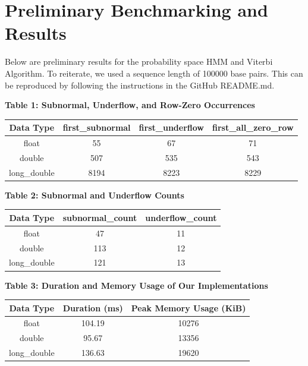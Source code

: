 \documentclass{article}
\begin{document}
\section{Preliminary Benchmarking and Results}
Below are preliminary results for the probability space HMM and Viterbi Algorithm. To reiterate, we used a sequence length of 100000 base pairs. This can be reproduced by following the instructions in the GitHub README.md.
\begin{center}
\textbf{Table 1: Subnormal, Underflow, and Row-Zero Occurrences}
\end{center}
\begin{center}
\begin{tabular}{||c c c c||} 
 \hline
 Data Type & first\_subnormal & first\_underflow & first\_all\_zero\_row \\ [0.5ex] 
 \hline\hline
 float & 55 & 67 & 71 \\ 
 \hline
 double & 507 & 535 & 543 \\
 \hline
 long\_double & 8194 & 8223 & 8229 \\
 \hline
\end{tabular}
\end{center}
\begin{center}
\textbf{Table 2: Subnormal and Underflow Counts}
\end{center}
\begin{center}
\begin{tabular}{||c c c||} 
 \hline
 Data Type & subnormal\_count & underflow\_count \\ [0.5ex] 
 \hline\hline
 float & 47 & 11 \\ 
 \hline
 double & 113 & 12 \\
 \hline
 long\_double & 121 & 13 \\
 \hline
\end{tabular}
\end{center}
\begin{center}
\textbf{Table 3: Duration and Memory Usage of Our Implementations}
\end{center}
\begin{center}
\begin{tabular}{||c c c||} 
 \hline
 Data Type & Duration (ms) & Peak Memory Usage (KiB) \\ [0.5ex] 
 \hline\hline
 float & 104.19 & 10276 \\ 
 \hline
 double & 95.67 & 13356 \\
 \hline
 long\_double & 136.63 & 19620 \\
 \hline
\end{tabular}
\end{center}
\end{document}
